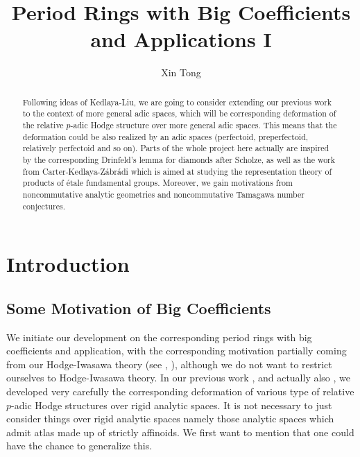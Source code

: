 \documentclass[12pt]{amsart}
\theoremstyle{definition}
\numberwithin{equation}{section}
\begin{document}
\normalfont



\title{Period Rings with Big Coefficients and Applications I}
\author{Xin Tong}



\maketitle


\begin{abstract}
\rm Following ideas of Kedlaya-Liu, we are going to consider extending our previous work to the context of more general adic spaces, which will be corresponding deformation of the relative $p$-adic Hodge structure over more general adic spaces. This means that the deformation could be also realized by an adic spaces (perfectoid, preperfectoid, relatively perfectoid and so on). Parts of the whole project here actually are inspired by the corresponding Drinfeld's lemma for diamonds after Scholze, as well as the work from Carter-Kedlaya-Z\'abr\'adi which is aimed at studying the representation theory of products of \'etale fundamental groups. Moreover, we gain motivations from noncommutative analytic geometries and noncommutative Tamagawa number conjectures.  
\end{abstract}



\newpage

\tableofcontents


\newpage



\section{Introduction}


\subsection{Some Motivation of Big Coefficients}

\noindent We initiate our development on the corresponding period rings with big coefficients and application, with the corresponding motivation partially coming from our Hodge-Iwasawa theory (see \cite{T1}, \cite{T2}), although we do not want to restrict ourselves to Hodge-Iwasawa theory. In our previous work \cite{T1}, \cite{T2} and actually also \cite{T3}, we developed very carefully the corresponding deformation of various type of relative $p$-adic Hodge structures over rigid analytic spaces. It is not necessary to just consider things over rigid analytic spaces namely those analytic spaces which admit atlas made up of strictly affinoids. We first want to mention that one could have the chance to generalize this.\\
\end{document}
